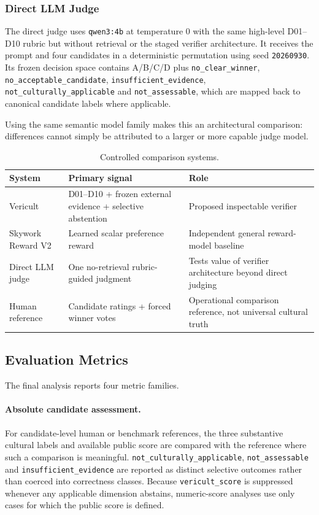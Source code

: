 \subsubsection{Direct LLM Judge}

The direct judge uses \texttt{qwen3:4b} at temperature 0 with the same high-level D01--D10 rubric but without retrieval or the staged verifier architecture. It receives the prompt and four candidates in a deterministic permutation using seed \texttt{20260930}. Its frozen decision space contains A/B/C/D plus \texttt{no\_clear\_winner}, \texttt{no\_acceptable\_candidate}, \texttt{insufficient\_evidence}, \texttt{not\_culturally\_applicable} and \texttt{not\_assessable}, which are mapped back to canonical candidate labels where applicable.

Using the same semantic model family makes this an architectural comparison: differences cannot simply be attributed to a larger or more capable judge model.

\begin{table}[htbp]
\centering
\caption{Controlled comparison systems.}
\label{tab:comparison-systems}
\begin{tabularx}{\textwidth}{p{3.2cm}p{4.3cm}X}
\toprule
\textbf{System} & \textbf{Primary signal} & \textbf{Role} \\
\midrule
Vericult & D01--D10 + frozen external evidence + selective abstention & Proposed inspectable verifier \\
Skywork Reward V2 & Learned scalar preference reward & Independent general reward-model baseline \\
Direct LLM judge & One no-retrieval rubric-guided judgment & Tests value of verifier architecture beyond direct judging \\
Human reference & Candidate ratings + forced winner votes & Operational comparison reference, not universal cultural truth \\
\bottomrule
\end{tabularx}
\end{table}

\subsection{Evaluation Metrics}
The final analysis reports four metric families.

\paragraph{Absolute candidate assessment.}
For candidate-level human or benchmark references, the three substantive cultural labels and available public score are compared with the reference where such a comparison is meaningful. \texttt{not\_culturally\_applicable}, \texttt{not\_assessable} and \texttt{insufficient\_evidence} are reported as distinct selective outcomes rather than coerced into correctness classes. Because \texttt{vericult\_score} is suppressed whenever any applicable dimension abstains, numeric-score analyses use only cases for which the public score is defined.

